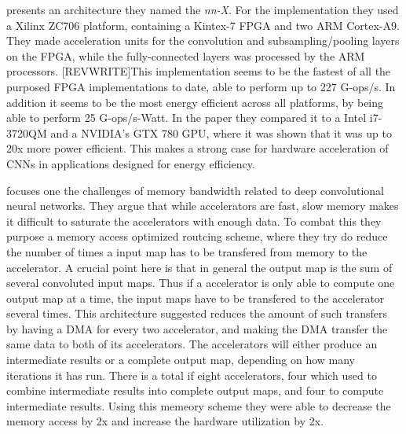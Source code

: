 \cite{Paper} presents an architecture they named the \textit{nn-X}. For the implementation they used a Xilinx ZC706 platform, containing a Kintex-7 FPGA and two ARM Cortex-A9. They made acceleration units for the convolution and subsampling/pooling layers on the FPGA, while the fully-connected layers was processed by the ARM processors. [REVWRITE]This implementation seems to be the fastest of all the purposed FPGA implementations to date, able to perform up to 227 G-ops/s. In addition it seems to be the most energy efficient across all platforms, by being able to perform 25 G-ops/s-Watt. In the paper they compared it to a Intel i7-3720QM and a NVIDIA’s GTX 780 GPU, where it was shown that it was up to 20x more power efficient. This makes a strong case for hardware acceleration of CNNs in applications designed for energy efficiency. 

\cite{INSERT_PAPER} focuses one the challenges of memory bandwidth related to deep convolutional neural networks. They argue that while accelerators are fast, slow memory makes it difficult to saturate the accelerators with enough data. To combat this they purpose a memory access optimized routcing scheme, where they try do reduce the number of times a input map has to be transfered from memory to the accelerator. A crucial point here is that in general the output map is the sum of several convoluted input maps. Thus if a accelerator is only able to compute one output map at a time, the input maps have to be transfered to the accelerator several times. This architecture suggested reduces the amount of such transfers by having a DMA for every two accelerator, and making the DMA transfer the same data to both of its accelerators. The accelerators will either produce an intermediate results or a complete output map, depending on how many iterations it has run. There is a total if eight accelerators, four which used to combine intermediate results into complete output maps, and four to compute intermediate results. Using this memeory scheme they were able to decrease the memory access by 2x and increase the hardware utilization by 2x. 

